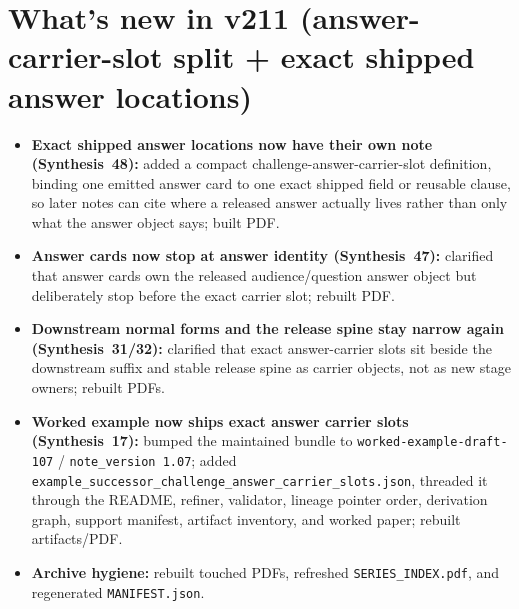 \documentclass[11pt]{article}
\begin{document}
\section{What's new in v211 (answer-carrier-slot split + exact shipped answer locations)}
\begin{itemize}[leftmargin=*]
\item \textbf{Exact shipped answer locations now have their own note (Synthesis~48):} added a compact challenge-answer-carrier-slot definition, binding one emitted answer card to one exact shipped field or reusable clause, so later notes can cite where a released answer actually lives rather than only what the answer object says; built PDF.
\item \textbf{Answer cards now stop at answer identity (Synthesis~47):} clarified that answer cards own the released audience/question answer object but deliberately stop before the exact carrier slot; rebuilt PDF.
\item \textbf{Downstream normal forms and the release spine stay narrow again (Synthesis~31/32):} clarified that exact answer-carrier slots sit beside the downstream suffix and stable release spine as carrier objects, not as new stage owners; rebuilt PDFs.
\item \textbf{Worked example now ships exact answer carrier slots (Synthesis~17):} bumped the maintained bundle to \texttt{worked-example-draft-107} / \texttt{note\_version 1.07}; added \texttt{example\_successor\_challenge\_answer\_carrier\_slots.json}, threaded it through the README, refiner, validator, lineage pointer order, derivation graph, support manifest, artifact inventory, and worked paper; rebuilt artifacts/PDF.
\item \textbf{Archive hygiene:} rebuilt touched PDFs, refreshed \texttt{SERIES\_INDEX.pdf}, and regenerated \texttt{MANIFEST.json}.
\end{itemize}
\end{document}
